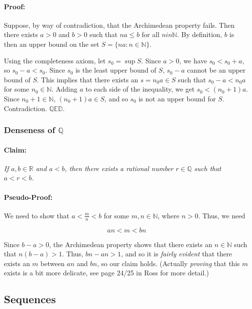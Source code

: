 \documentclass[]{article}
\begin{document}
\paragraph{Proof:}

Suppose, by way of contradiction, that the Archimedean property fails.
Then there exists $a>0$ and $b>0$ such that $na \le b$ for all
$n in \mathbb{N}$. By definition, $b$ is then an upper bound on the set
$S = \{na : n \in \mathbb{N}\}$.

Using the completeness axiom, let $s_0 = \sup S$. Since $a > 0$, we have
$s_0 < s_0 + a$, so $s_0 - a < s_0$. Since $s_0$ is the least upper
bound of $S$, $s_0 - a$ cannot be an upper bound of $S$. This implies
that there exists an $s = n_0 a \in S$ such that $s_0 - a < n_0 a$ for
some $n_0 \in \mathbb{N}$. Adding $a$ to each side of the inequality, we
get $s_0 < (n_0 + 1) a$. Since $n_0 + 1 \in \mathbb{N}$,
$(n_0 +1) a \in S$, and so $s_0$ is not an upper bound for $S$.
Contradiction. $\mathbb{QED}$.

\subsubsection{Denseness of $\mathbb{Q}$}

\paragraph{Claim:}

\emph{If $a,b \in \mathbb{R}$ and $a<b$, then there exists a rational
number $r \in \mathbb{Q}$ such that $a < r < b$.}

\paragraph{Pseudo-Proof:}

We need to show that $a < \frac{m}{n} < b$ for some
$m,n \in \mathbb{N}$, where $n > 0$. Thus, we need

\[ an < m < bn \]

Since $b-a > 0$, the Archimedean property shows that there exists an
$n \in \mathbb{N}$ such that $n(b-a) > 1$. Thus, $bn - an > 1$, and so
it is \emph{fairly evident} that there exists an $m$ between $an$ and
$bn$, so our claim holds. (Actually \emph{proving} that this $m$ exists
is a bit more delicate, see page 24/25 in Ross for more detail.)

\subsection{Sequences}
\end{document}
